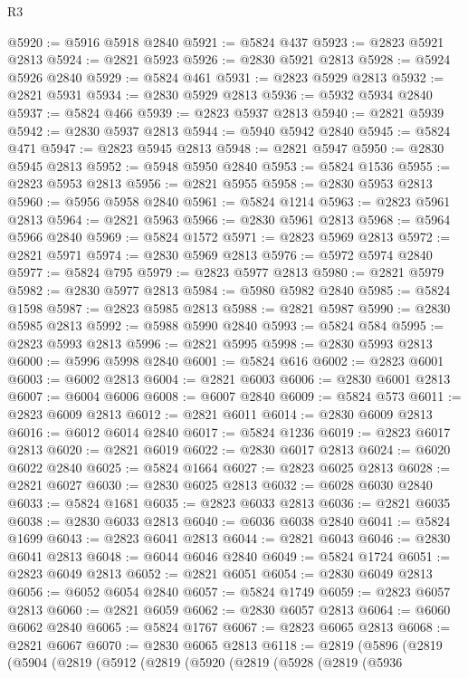 \begin{lexlean}{R3}
\begin{coremodule}
@5920 := @5916 @5918 @2840
@5921 := @5824 @437
@5923 := @2823 @5921 @2813
@5924 := @2821 @5923
@5926 := @2830 @5921 @2813
@5928 := @5924 @5926 @2840
@5929 := @5824 @461
@5931 := @2823 @5929 @2813
@5932 := @2821 @5931
@5934 := @2830 @5929 @2813
@5936 := @5932 @5934 @2840
@5937 := @5824 @466
@5939 := @2823 @5937 @2813
@5940 := @2821 @5939
@5942 := @2830 @5937 @2813
@5944 := @5940 @5942 @2840
@5945 := @5824 @471
@5947 := @2823 @5945 @2813
@5948 := @2821 @5947
@5950 := @2830 @5945 @2813
@5952 := @5948 @5950 @2840
@5953 := @5824 @1536
@5955 := @2823 @5953 @2813
@5956 := @2821 @5955
@5958 := @2830 @5953 @2813
@5960 := @5956 @5958 @2840
@5961 := @5824 @1214
@5963 := @2823 @5961 @2813
@5964 := @2821 @5963
@5966 := @2830 @5961 @2813
@5968 := @5964 @5966 @2840
@5969 := @5824 @1572
@5971 := @2823 @5969 @2813
@5972 := @2821 @5971
@5974 := @2830 @5969 @2813
@5976 := @5972 @5974 @2840
@5977 := @5824 @795
@5979 := @2823 @5977 @2813
@5980 := @2821 @5979
@5982 := @2830 @5977 @2813
@5984 := @5980 @5982 @2840
@5985 := @5824 @1598
@5987 := @2823 @5985 @2813
@5988 := @2821 @5987
@5990 := @2830 @5985 @2813
@5992 := @5988 @5990 @2840
@5993 := @5824 @584
@5995 := @2823 @5993 @2813
@5996 := @2821 @5995
@5998 := @2830 @5993 @2813
@6000 := @5996 @5998 @2840
@6001 := @5824 @616
@6002 := @2823 @6001
@6003 := @6002 @2813
@6004 := @2821 @6003
@6006 := @2830 @6001 @2813
@6007 := @6004 @6006
@6008 := @6007 @2840
@6009 := @5824 @573
@6011 := @2823 @6009 @2813
@6012 := @2821 @6011
@6014 := @2830 @6009 @2813
@6016 := @6012 @6014 @2840
@6017 := @5824 @1236
@6019 := @2823 @6017 @2813
@6020 := @2821 @6019
@6022 := @2830 @6017 @2813
@6024 := @6020 @6022 @2840
@6025 := @5824 @1664
@6027 := @2823 @6025 @2813
@6028 := @2821 @6027
@6030 := @2830 @6025 @2813
@6032 := @6028 @6030 @2840
@6033 := @5824 @1681
@6035 := @2823 @6033 @2813
@6036 := @2821 @6035
@6038 := @2830 @6033 @2813
@6040 := @6036 @6038 @2840
@6041 := @5824 @1699
@6043 := @2823 @6041 @2813
@6044 := @2821 @6043
@6046 := @2830 @6041 @2813
@6048 := @6044 @6046 @2840
@6049 := @5824 @1724
@6051 := @2823 @6049 @2813
@6052 := @2821 @6051
@6054 := @2830 @6049 @2813
@6056 := @6052 @6054 @2840
@6057 := @5824 @1749
@6059 := @2823 @6057 @2813
@6060 := @2821 @6059
@6062 := @2830 @6057 @2813
@6064 := @6060 @6062 @2840
@6065 := @5824 @1767
@6067 := @2823 @6065 @2813
@6068 := @2821 @6067
@6070 := @2830 @6065 @2813
@6118 := @2819
    (@5896
      (@2819
        (@5904
          (@2819
            (@5912
              (@2819
                (@5920
                  (@2819
                    (@5928
                      (@2819
                        (@5936

\end{coremodule}
\end{lexlean}

